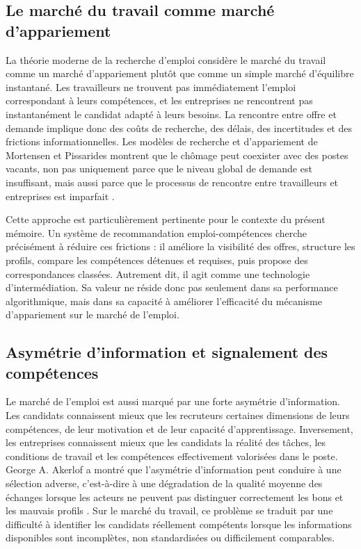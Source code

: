 \documentclass[12pt,twoside]{report}
\begin{document}
\subsection{Le marché du travail comme marché d'appariement}
La théorie moderne de la recherche d'emploi considère le marché du travail comme un marché d'appariement plutôt que comme un simple marché d'équilibre instantané. Les travailleurs ne trouvent pas immédiatement l'emploi correspondant à leurs compétences, et les entreprises ne rencontrent pas instantanément le candidat adapté à leurs besoins. La rencontre entre offre et demande implique donc des coûts de recherche, des délais, des incertitudes et des frictions informationnelles. Les modèles de recherche et d'appariement de Mortensen et Pissarides montrent que le chômage peut coexister avec des postes vacants, non pas uniquement parce que le niveau global de demande est insuffisant, mais aussi parce que le processus de rencontre entre travailleurs et entreprises est imparfait \cite{mortensen1994job,pissarides2000equilibrium}.

Cette approche est particulièrement pertinente pour le contexte du présent mémoire. Un système de recommandation emploi-compétences cherche précisément à réduire ces frictions : il améliore la visibilité des offres, structure les profils, compare les compétences détenues et requises, puis propose des correspondances classées. Autrement dit, il agit comme une technologie d'intermédiation. Sa valeur ne réside donc pas seulement dans sa performance algorithmique, mais dans sa capacité à améliorer l'efficacité du mécanisme d'appariement sur le marché de l'emploi.

\subsection{Asymétrie d'information et signalement des compétences}
Le marché de l'emploi est aussi marqué par une forte asymétrie d'information. Les candidats connaissent mieux que les recruteurs certaines dimensions de leurs compétences, de leur motivation et de leur capacité d'apprentissage. Inversement, les entreprises connaissent mieux que les candidats la réalité des tâches, les conditions de travail et les compétences effectivement valorisées dans le poste. George A. Akerlof a montré que l'asymétrie d'information peut conduire à une sélection adverse, c'est-à-dire à une dégradation de la qualité moyenne des échanges lorsque les acteurs ne peuvent pas distinguer correctement les bons et les mauvais profils \cite{akerlof1970lemons}. Sur le marché du travail, ce problème se traduit par une difficulté à identifier les candidats réellement compétents lorsque les informations disponibles sont incomplètes, non standardisées ou difficilement comparables.
\end{document}

